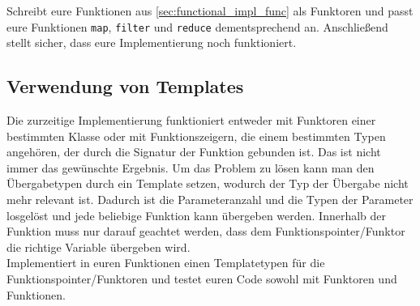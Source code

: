 Schreibt eure Funktionen aus \ref{sec:functional_impl_func} als Funktoren und passt eure Funktionen \lstinline{map}, \lstinline{filter} und \lstinline{reduce} dementsprechend an.
Anschließend stellt sicher, dass eure Implementierung noch funktioniert.

\subsection{Verwendung von Templates}
Die zurzeitige Implementierung funktioniert entweder mit Funktoren einer bestimmten Klasse oder mit Funktionszeigern, die einem bestimmten Typen angehören, der durch die Signatur der Funktion gebunden ist.
Das ist nicht immer das gewünschte Ergebnis.
Um das Problem zu lösen kann man den Übergabetypen durch ein Template setzen, wodurch der Typ der Übergabe nicht mehr relevant ist.
Dadurch ist die Parameteranzahl und die Typen der Parameter losgelöst und jede beliebige Funktion kann übergeben werden.
Innerhalb der Funktion muss nur darauf geachtet werden, dass dem Funktionspointer/Funktor die richtige Variable übergeben wird. \\

Implementiert in euren Funktionen einen Templatetypen für die Funktionspointer/Funktoren und testet euren Code sowohl mit Funktoren und Funktionen.
